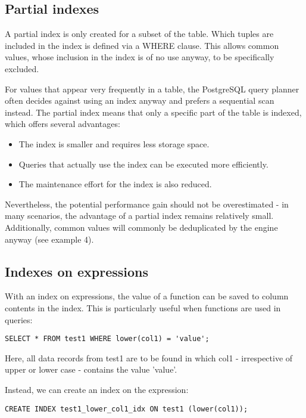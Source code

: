 \documentclass[11pt]{scrartcl}
\begin{document}
\subsection{Partial indexes}

A partial index is only created for a subset of the table. Which tuples are included in the index is defined via a WHERE clause. This allows common values, whose inclusion in the index is of no use anyway, to be specifically excluded.

For values that appear very frequently in a table, the PostgreSQL query planner often decides against using an index anyway and prefers a sequential scan instead. The partial index means that only a specific part of the table is indexed, which offers several advantages:

\begin{itemize}
 \item The index is smaller and requires less storage space.
 \item Queries that actually use the index can be executed more efficiently.
 \item The maintenance effort for the index is also reduced.
\end{itemize}

Nevertheless, the potential performance gain should not be overestimated - in many scenarios, the advantage of a partial index remains relatively small.  Additionally, common values will commonly be deduplicated by the engine anyway (see example 4).

\subsection{Indexes on expressions}

With an index on expressions, the value of a function can be saved to column contents in the index. This is particularly useful when functions are used in queries:

\begin{lstlisting}[style=dbtsql]
SELECT * FROM test1 WHERE lower(col1) = 'value';
\end{lstlisting}

Here, all data records from test1 are to be found in which col1 - irrespective of upper or lower case - contains the value 'value'.

Instead, we can create an index on the expression:

\begin{lstlisting}[style=dbtsql]
CREATE INDEX test1_lower_col1_idx ON test1 (lower(col1));
\end{lstlisting}
\end{document}
